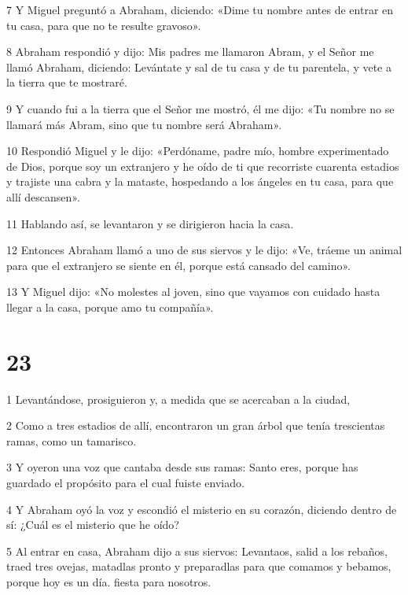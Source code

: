 \par 7 Y Miguel preguntó a Abraham, diciendo: «Dime tu nombre antes de entrar en tu casa, para que no te resulte gravoso».

\par 8 Abraham respondió y dijo: Mis padres me llamaron Abram, y el Señor me llamó Abraham, diciendo: Levántate y sal de tu casa y de tu parentela, y vete a la tierra que te mostraré.

\par 9 Y cuando fui a la tierra que el Señor me mostró, él me dijo: «Tu nombre no se llamará más Abram, sino que tu nombre será Abraham».

\par 10 Respondió Miguel y le dijo: «Perdóname, padre mío, hombre experimentado de Dios, porque soy un extranjero y he oído de ti que recorriste cuarenta estadios y trajiste una cabra y la mataste, hospedando a los ángeles en tu casa, para que allí descansen».

\par 11 Hablando así, se levantaron y se dirigieron hacia la casa.

\par 12 Entonces Abraham llamó a uno de sus siervos y le dijo: «Ve, tráeme un animal para que el extranjero se siente en él, porque está cansado del camino».

\par 13 Y Miguel dijo: «No molestes al joven, sino que vayamos con cuidado hasta llegar a la casa, porque amo tu compañía».

\chapter{23}

\par 1 Levantándose, prosiguieron y, a medida que se acercaban a la ciudad,

\par 2 Como a tres estadios de allí, encontraron un gran árbol que tenía trescientas ramas, como un tamarisco.

\par 3 Y oyeron una voz que cantaba desde sus ramas: Santo eres, porque has guardado el propósito para el cual fuiste enviado.

\par 4 Y Abraham oyó la voz y escondió el misterio en su corazón, diciendo dentro de sí: ¿Cuál es el misterio que he oído?

\par 5 Al entrar en casa, Abraham dijo a sus siervos: Levantaos, salid a los rebaños, traed tres ovejas, matadlas pronto y preparadlas para que comamos y bebamos, porque hoy es un día. fiesta para nosotros.

